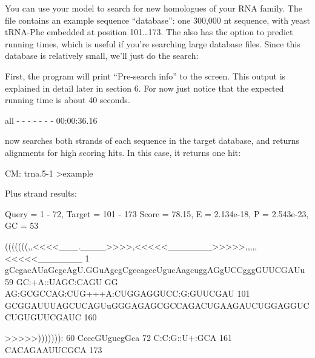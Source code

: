 You can use your model to search for new homologues of your RNA
family. The file  contains an example sequence
``database'': one 300,000 nt sequence, with yeast tRNA-Phe embedded at
position 101\ldots173. The  also has the
 option to predict running times, which is useful if
you're searching large database files. Since this database is
relatively small, we'll just do the search:


First, the program will print ``Pre-search info'' to the screen. This
output is explained in detail later in section 6. For now just notice
that the expected running time is about 40 seconds.

\begin{sreoutput}
  all    -    -    -      -           -        -        -  00:00:36.16
\end{sreoutput}

 now searches both strands of each sequence in the
target database, and returns alignments for high scoring hits.  In
this case, it returns one hit:

\begin{sreoutput}
CM: trna.5-1
>example

  Plus strand results:

 Query = 1 - 72, Target = 101 - 173
 Score = 78.15, E = 2.134e-18, P = 2.543e-23, GC =  53

           (((((((,,<<<<___.____>>>>,<<<<<_______>>>>>,,,,,<<<<<_______
         1 gCcgacAUaGcgcAgU.GGuAgcgCgccagccUgucAagcuggAGgUCCgggGUUCGAUu 59      
           GC:+A::UAGC:CAGU GG AG:GCGCCAG:CUG+++A:CUGGAGGUCC:G:GUUCGAU 
       101 GCGGAUUUAGCUCAGUuGGGAGAGCGCCAGACUGAAGAUCUGGAGGUCCUGUGUUCGAUC 160     

           >>>>>))))))):
        60 CcccGUgucgGca 72      
           C:C:G::U+:GCA
       161 CACAGAAUUCGCA 173     
\end{sreoutput}

